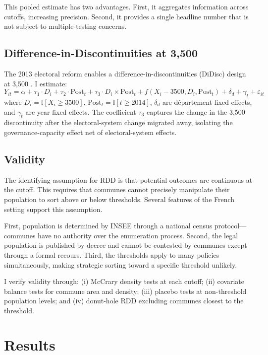 \documentclass[12pt]{article}
\newcommand{\ind}{\mathbb{I}}
\begin{document}
This pooled estimate has two advantages. First, it aggregates information across cutoffs, increasing precision. Second, it provides a single headline number that is not subject to multiple-testing concerns.

\subsection{Difference-in-Discontinuities at 3,500}

The 2013 electoral reform enables a difference-in-discontinuities (DiDisc) design at 3,500 \citep{eggers2018}. I estimate:
\begin{equation}
Y_{it} = \alpha + \tau_1 \cdot D_i + \tau_2 \cdot \text{Post}_t + \tau_3 \cdot D_i \times \text{Post}_t + f(X_i - 3500, D_i, \text{Post}_t) + \delta_d + \gamma_t + \varepsilon_{it}
\label{eq:didisc}
\end{equation}
where $D_i = \ind[X_i \geq 3500]$, $\text{Post}_t = \ind[t \geq 2014]$, $\delta_d$ are d\'{e}partement fixed effects, and $\gamma_t$ are year fixed effects. The coefficient $\tau_3$ captures the change in the 3,500 discontinuity after the electoral-system change migrated away, isolating the governance-capacity effect net of electoral-system effects.

\subsection{Validity}

The identifying assumption for RDD is that potential outcomes are continuous at the cutoff. This requires that communes cannot precisely manipulate their population to sort above or below thresholds. Several features of the French setting support this assumption.

First, population is determined by INSEE through a national census protocol---communes have no authority over the enumeration process. Second, the legal population is published by decree and cannot be contested by communes except through a formal recours. Third, the thresholds apply to many policies simultaneously, making strategic sorting toward a specific threshold unlikely.

I verify validity through: (i) McCrary density tests at each cutoff; (ii) covariate balance tests for commune area and density; (iii) placebo tests at non-threshold population levels; and (iv) donut-hole RDD excluding communes closest to the threshold.

\section{Results}
\end{document}
